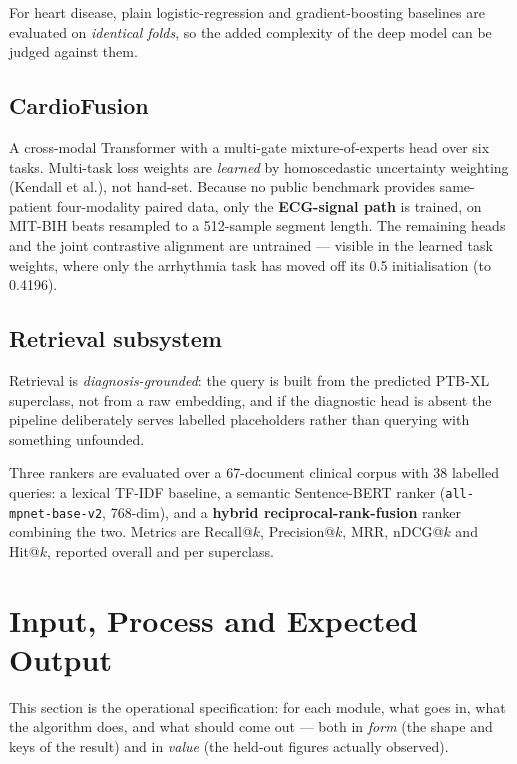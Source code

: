 \documentclass[11pt,a4paper]{article}
\newcommand{\code}[1]{\texttt{\small #1}}
\begin{document}
For heart disease, plain logistic-regression and gradient-boosting
baselines are evaluated on \emph{identical folds}, so the added complexity
of the deep model can be judged against them.

\subsection{CardioFusion}

A cross-modal Transformer with a multi-gate mixture-of-experts head over
six tasks. Multi-task loss weights are \emph{learned} by homoscedastic
uncertainty weighting (Kendall et al.), not hand-set. Because no public
benchmark provides same-patient four-modality paired data, only the
\textbf{ECG-signal path} is trained, on MIT-BIH beats resampled to a
512-sample segment length. The remaining heads and the joint contrastive
alignment are untrained --- visible in the learned task weights, where
only the arrhythmia task has moved off its 0.5 initialisation
(to 0.4196).

\subsection{Retrieval subsystem}

Retrieval is \emph{diagnosis-grounded}: the query is built from the
predicted PTB-XL superclass, not from a raw embedding, and if the
diagnostic head is absent the pipeline deliberately serves labelled
placeholders rather than querying with something unfounded.

Three rankers are evaluated over a 67-document clinical corpus with 38
labelled queries: a lexical TF-IDF baseline, a semantic Sentence-BERT
ranker (\code{all-mpnet-base-v2}, 768-dim), and a \textbf{hybrid
reciprocal-rank-fusion} ranker combining the two. Metrics are
Recall@$k$, Precision@$k$, MRR, nDCG@$k$ and Hit@$k$, reported overall and
per superclass.

\section{Input, Process and Expected Output}
\label{sec:io}

This section is the operational specification: for each module, what goes
in, what the algorithm does, and what should come out --- both in
\emph{form} (the shape and keys of the result) and in \emph{value} (the
held-out figures actually observed).
\end{document}
